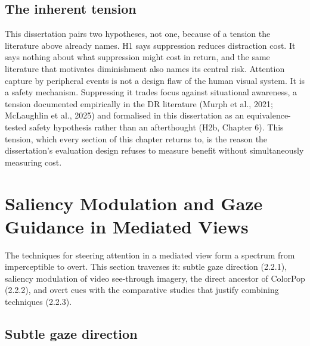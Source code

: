 \subsection{The inherent tension}

This dissertation pairs two hypotheses, not one, because of a tension the literature above already
names. H1 says suppression reduces distraction cost. It says nothing about what suppression might
cost in return, and the same literature that motivates diminishment also names its central risk.
Attention capture by
peripheral events is not a design flaw of the human visual system. It is a safety mechanism.
Suppressing it trades focus against situational awareness, a tension documented empirically in the
DR literature (Murph et al., 2021; McLaughlin et al., 2025) and formalised in this
dissertation as an equivalence-tested safety hypothesis rather than an afterthought (H2b, Chapter 6).
This tension, which every section of this chapter returns to, is the reason the dissertation's
evaluation design refuses to measure benefit without simultaneously measuring cost.

\section{Saliency Modulation and Gaze Guidance in Mediated Views}

The techniques for steering attention in a mediated view form a spectrum from imperceptible to overt.
This section traverses it: subtle gaze direction (2.2.1), saliency modulation of video see-through
imagery, the direct ancestor of ColorPop (2.2.2), and overt cues with the comparative studies that
justify combining techniques (2.2.3).

\subsection{Subtle gaze direction}

